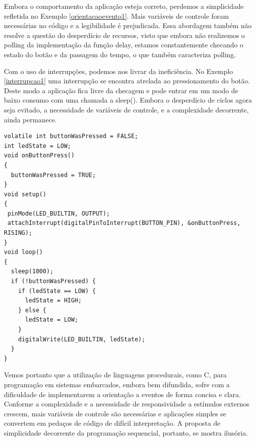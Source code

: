 \documentclass[11pt]{article}
\begin{document}
\par Embora o comportamento da aplicação esteja correto, perdemos a simplicidade refletida no Exemplo \ref{orientacaoevento1}. Mais variáveis de controle foram necessárias no código e a legibilidade é prejudicada. Essa abordagem também não resolve a questão do desperdício de recursos, visto que embora não realizemos o polling da implementação da função delay, estamos constantemente checando o estado do botão e da passagem do tempo, o que também caracteriza polling.
\par Com o uso de interrupções, podemos nos livrar da ineficiência. No Exemplo \ref{interrupcao1} uma interrupção se encontra atrelada ao pressionamento do botão. Deste modo a aplicação fica livre da checagem e pode entrar em um modo de baixo consumo com uma chamada a sleep(). Embora o desperdício de ciclos agora seja evitado, a necessidade de variáveis de controle, e a complexidade decorrente, ainda permanece.
\begin{lstlisting}[style=CStyle,label=interrupcao1,caption=Aplicação utilizando interrupção]
volatile int buttonWasPressed = FALSE;
int ledState = LOW;             
void onButtonPress()
{
  buttonWasPressed = TRUE;
}
void setup()
{
 pinMode(LED_BUILTIN, OUTPUT);
 attachInterrupt(digitalPinToInterrupt(BUTTON_PIN), &onButtonPress, RISING);
}
void loop()
{
  sleep(1000);
  if (!buttonWasPressed) {
    if (ledState == LOW) {
      ledState = HIGH;
    } else {
      ledState = LOW;
    }
    digitalWrite(LED_BUILTIN, ledState);
  }
}
\end{lstlisting}
\par\par Vemos portanto que a utilização de linguagens procedurais, como C, para programação em sistemas embarcados, embora bem difundida, sofre com a dificuldade de implementarem a orientação a eventos de forma concisa e clara. Conforme a complexidade e a necessidade de responsividade a estímulos externos crescem, mais variáveis de controle são necessárias e aplicações simples se convertem em pedaços de código de difícil interpretação. A proposta de simplicidade decorrente da programação sequencial, portanto, se mostra ilusória.
\end{document}
